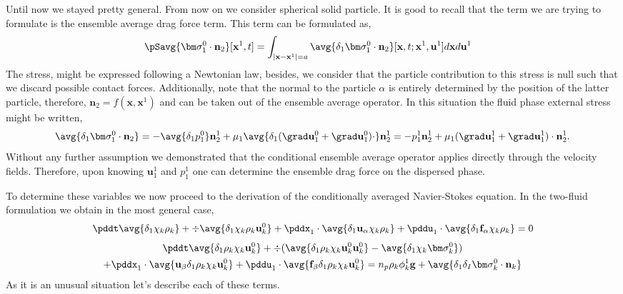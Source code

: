 Until now we stayed pretty general. 
From now on we consider spherical solid particle.
It is good to recall that the term we are trying to formulate is the ensemble average  drag force term. 
This term can be formulated as, 
\begin{align}
    \pSavg{\bm\sigma_1^0\cdot\textbf{n}_2}[\textbf{x}^1,t]
    &=
    \int_{|\textbf{x}-\textbf{x}^1|=a}
    \avg{\delta_1  \bm\sigma_1^0\cdot \textbf{n}_2}
    [\textbf{x},t;\textbf{x}^1,\textbf{u}^1]
    d\textbf{x}
    d\textbf{u}^1
\end{align}
The stress, might be expressed following a Newtonian law, besides, we consider that the particle contribution to this stress is null such that we discard possible contact forces. 
Additionally, note that the normal to the particle $\alpha$ is entirely determined by the position of the latter particle, therefore, $\textbf{n}_2 = f(\textbf{x},\textbf{x}^1)$ and can be taken out of the ensemble average operator. 
In this situation the fluid phase external stress might be written, 
\begin{equation*}
    \avg{\delta_1  \bm\sigma_1^0\cdot \textbf{n}_2}
    = 
    - \avg{\delta_1  p_1^0 }\textbf{n}_2^1
    + \mu_1 \avg{\delta_1  (\grad \textbf{u}_1^0 + \grad \textbf{u}_1^0)\cdot }\textbf{n}_2^1
    = 
    -   p_1^1 \textbf{n}_2^1
    + \mu_1  (\grad \textbf{u}_1^1 + \grad \textbf{u}_1^1) \cdot \textbf{n}_2^1. 
\end{equation*}
Without any further assumption we demonstrated that the conditional ensemble average operator applies directly through the velocity fields. 
Therefore, upon knowing $\textbf{u}_1^1$ and $p_1^1$ one can determine the ensemble drag force on the dispersed phase. 







To determine these variables we now proceed to the derivation of the conditionally averaged Navier-Stokes equation. 
In the two-fluid formulation we obtain in the most general case, 
\begin{equation}
    \pddt \avg{\delta_1 \chi_k \rho_k}
    +  \div \avg{\delta_1 \chi_k \rho_k \textbf{u}_k^0}
    +  \pddx_1 \cdot
    \avg{\delta_1 \textbf{u}_\alpha \chi_k \rho_k}
    +  \pddu_1 \cdot
    \avg{\delta_1  \textbf{f}_\alpha \chi_k \rho_k}
    = 0
\end{equation}
\begin{multline}
    \pddt \avg{\delta_1 \rho_k \chi_k \textbf{u}_k^0 }
    + \div(
        \avg{\delta_1 \rho_k \chi_k \textbf{u}_k^0 \textbf{u}^0_k  }
    - \avg{\delta_1\chi_k\bm\sigma^0_k})\\
    + \pddx_1 \cdot
        \avg{\textbf{u}_\beta\delta_1 \rho_k \chi_k \textbf{u}_k^0 }
    + \pddu_1 \cdot
        \avg{\textbf{f}_\beta\delta_1 \rho_k \chi_k \textbf{u}_k^0 }
    = n_p  \rho_k \phi_k^1 \textbf{g} 
    + \avg{\delta_1\delta_I \bm\sigma_k^0 \cdot \textbf{n}_k}
\end{multline}
As it is an unusual situation let's describe each of these terms. 

